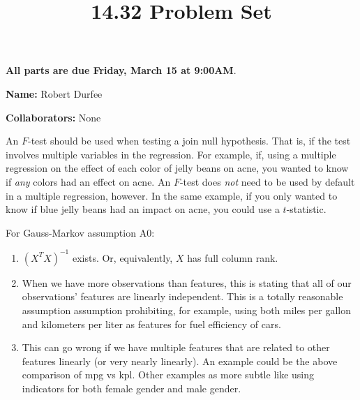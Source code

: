 \documentclass[12pt,twoside]{article}
\title{14.32 Problem Set \theproblemsetnum}
\newcommand{\theproblemsetnum}{3}
\newcommand{\releasedate}{Friday, March 8}
\newcommand{\partaduedate}{Friday, March 15}
\begin{document}
\handout{Problem Set \theproblemsetnum}{\releasedate}
\textbf{All parts are due {\bf \partaduedate} at {\bf 9:00AM}}.

\setlength{\parindent}{0pt}
\medskip\hrulefill\medskip

{\bf Name:} Robert Durfee

\medskip

{\bf Collaborators:} None

\medskip\hrulefill

\begin{problems}

\problem  %

An $F$-test should be used when testing a join null hypothesis. That is, if the
test involves multiple variables in the regression. For example, if, using a
multiple regression on the effect of each color of jelly beans on acne, you
wanted to know if {\it any} colors had an effect on acne. An $F$-test does {\it 
not} need to be used by default in a multiple regression, however. In the same
example, if you only wanted to know if blue jelly beans had an impact on acne,
you could use a $t$-statistic.

\problem  %

\begin{problemparts}

\problempart %

For Gauss-Markov assumption A0:

\begin{enumerate}[label=\textbf{\roman*})]

    \item $\left(X^T X\right)^{-1}$ exists. Or, equivalently, $X$ has full 
        column rank.
        
    \item When we have more observations than features, this is stating that 
        all of our observations' features are linearly independent. This is a 
        totally reasonable assumption assumption prohibiting, for example, using
        both miles per gallon and kilometers per liter as features for fuel
        efficiency of cars.
        
    \item This can go wrong if we have multiple features that are related to
        other features linearly (or very nearly linearly). An example could be
        the above comparison of mpg vs kpl. Other examples as more subtle like
        using indicators for both female gender and male gender.
        

\end{enumerate}
\end{problemparts}
\end{problems}
\end{document}
